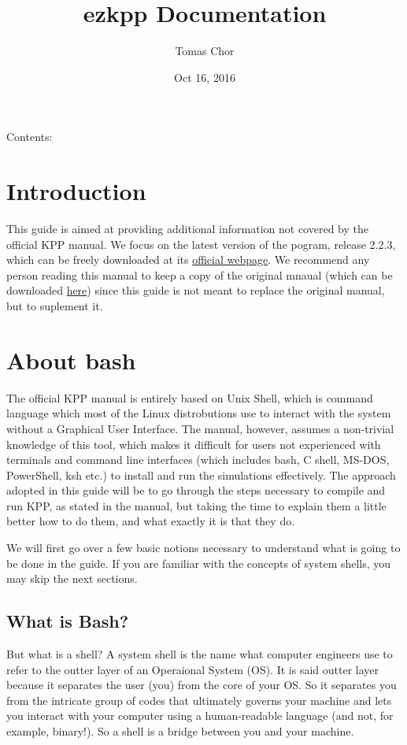 \documentclass[letterpaper,10pt,openany,oneside]{sphinxmanual}
\title{ezkpp Documentation}
\date{Oct 16, 2016}
\author{Tomas Chor}
\begin{document}
\maketitle
\tableofcontents
{}\label{index::doc}


Contents:


\chapter{Introduction}
\label{intro:introduction}\label{intro:easy-guide-to-compiling-and-running-kpp}\label{intro::doc}
This guide is aimed at providing additional information not covered by the
official KPP manual. We focus on the latest version of the pogram, release
2.2.3, which can be freely downloaded at its \href{http://people.cs.vt.edu/~asandu/Software/Kpp/}{official webpage}. We recommend any person
reading this manual to keep a copy of the original mnaual (which can be
downloaded \href{http://people.cs.vt.edu/~asandu/Software/Kpp/}{here}) since this
guide is not meant to replace the original manual, but to suplement it.


\chapter{About bash}
\label{bash:about-bash}\label{bash::doc}
The official KPP manual is entirely based on Unix Shell, which is command
language which most of the Linux distrobutions use to interact with the system
without a Graphical User Interface. The manual, however, assumes a non-trivial
knowledge of this tool, which makes it difficult for users not experienced with
terminals and command line interfaces (which includes bash, C shell, MS-DOS,
PowerShell, ksh etc.) to install and run the simulations effectively. The
approach adopted in this guide will be to go through the steps necessary to
compile and run KPP, as stated in the manual, but taking the time to explain
them a little better how to do them, and what exactly it is that they do.

We will first go over a few basic notions necessary to understand what is going
to be done in the guide. If you are familiar with the concepts of system shells,
you may skip the next sections.


\section{What is Bash?}
\label{bash:what-is-bash}
But what is a shell? A system shell is the name what computer engineers use to
refer to the outter layer of an Operaional System (OS). It is said outter layer
because it separates the user (you) from the core of your OS. So it separates
you from the intricate group of codes that ultimately governs your machine and
lets you interact with your computer using a human-readable language (and not,
for example, binary!). So a shell is a bridge between you and your machine.
\end{document}
